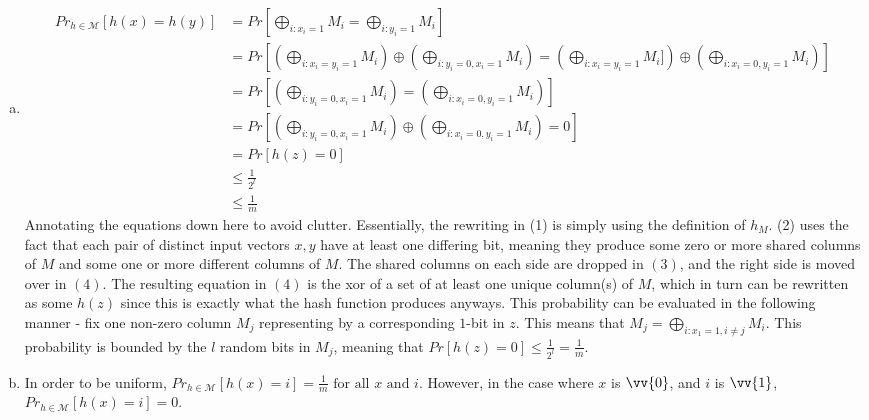\documentclass[11pt]{article}
\begin{document}



\begin{enumerate}[(a)]
\item
\begin{solution}
    \begin{align}
        Pr_{h \in \mathcal{M}}[h(x) = h(y)] &= Pr[\bigoplus_{i: x_i = 1} M_i = \bigoplus_{i: y_i = 1} M_i] \\
        &= Pr[(\bigoplus_{i: x_i = y_i = 1} M_i) \oplus (\bigoplus_{i: y_i = 0, x_i = 1} M_i) = (\bigoplus_{i: x_i = y_i = 1} M_i]) \oplus (\bigoplus_{i: x_i = 0, y_i = 1} M_i)] \\
        &= Pr[(\bigoplus_{i: y_i = 0, x_i = 1} M_i) = (\bigoplus_{i: x_i = 0, y_i = 1} M_i)] \\
        &= Pr[(\bigoplus_{i: y_i = 0, x_i = 1} M_i) \oplus (\bigoplus_{i: x_i = 0, y_i = 1} M_i) = 0] \\
        &= Pr[h(z) = 0] \\
        &\leq \frac{1}{2^l} \\
        &\leq \frac{1}{m}
    \end{align}
    Annotating the equations down here to avoid clutter. Essentially, the rewriting in (1) is simply using the definition of $h_M$. (2) uses the fact that each pair of distinct input vectors $x,y$ have at least one differing bit, meaning they produce some zero or more shared columns of $M$ and some one or more different columns of $M$. The shared columns on each side are dropped in $(3)$, and the right side is moved over in $(4)$. The resulting equation in $(4)$ is the xor of a set of at least one unique column(s) of $M$, which in turn can be rewritten as some $h(z)$ since this is exactly what the hash function produces anyways. This probability can be evaluated in the following manner - fix one non-zero column $M_{j}$ representing by a corresponding $1$-bit in $z$. This means that $M_{j} = \bigoplus_{i: x_1 = 1, i \neq j} M_i$. This probability is bounded by the $l$ random bits in $M_{j}$, meaning that $Pr[h(z) = 0] \leq \frac{1}{2^l} = \frac{1}{m}$.
\end{solution}

\item
\begin{solution}
    In order to be uniform, $Pr_{h \in \mathcal{M}}[h(x) = i] = \frac{1}{m} \text{ for all } x \text{ and } i$. However, in the case where $x$ is $\vv{0}$, and $i$ is $\vv{1}$, $Pr_{h \in \mathcal{M}}[h(x) = i] = 0$.
\end{solution}


\end{enumerate}
\end{document}
